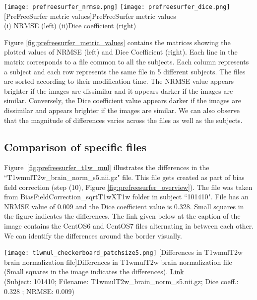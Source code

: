 \begin{center}
\texttt{[image: prefreesurfer\_nrmse.png]}%
\texttt{[image: prefreesurfer\_dice.png]}
[PreFreeSurfer metric values]{PreFreeSurfer metric values\\(i) NRMSE (left) (ii)Dice coefficient (right)}
\label{fig:prefreesurfer_metric_values}
\end{center}

Figure \ref{fig:prefreesurfer_metric_values} contains the matrices showing the plotted values of NRMSE (left) and Dice Coefficient (right).
Each line in the matrix corresponds to a file common to all the subjects.
Each column represents a subject and each row represents the same file in 5 different subjects. The files are sorted according to their modification time.
The NRMSE value appears brighter if the images are dissimilar and it appears darker if the images are similar. Conversely, the Dice coefficient value appears darker if the images are dissimilar and appears brighter if the images are similar. We can also observe that the magnitude of differences varies across the files as well as the subjects.

\subsection{Comparison of specific files}
Figure~\ref{fig:prefreesurfer_t1w_mul} illustrates the differences in the ``T1wmulT2w\_brain\_norm\_s5.nii.gz" file. This file gets created as part of bias field correction (step (10), Figure \ref{fig:prefreesurfer_overview}). The file was taken from BiasFieldCorrection\_sqrtT1wXT1w folder in subject ``101410". File has an NRMSE value of 0.009 and the Dice coefficient value is 0.328. Small squares in the figure indicates the differences.
The link given below at the caption of the image contains the CentOS6 and CentOS7 files alternating in between each other. We can identify the differences around the border visually.

\begin{center}
\texttt{[image: t1wmul\_checkerboard\_patchsize5.png]}
[Differences in T1wmulT2w brain normalization file]{Differences in T1wmulT2w brain normalization file (Small squares in the image indicates the differences). \href{https://drive.google.com/file/d/1eHyrs180QbF4a-kSSz5mFkdirTgdXhc_/view?usp=sharing}{Link}\\(Subject: 101410; Filename: T1wmulT2w\_brain\_norm\_s5.nii.gz; Dice coeff.: 0.328 ; NRMSE: 0.009)}
\label{fig:prefreesurfer_t1w_mul}
\end{center}

